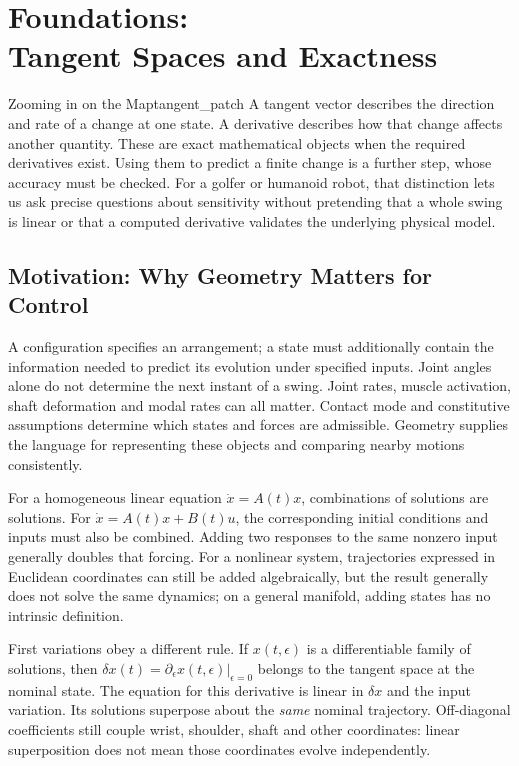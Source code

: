 \chapter[Foundations: Tangent Spaces and Exactness]{Foundations:\\Tangent Spaces and Exactness}
\label{ch:foundations}

\begin{laymansbox}{Zooming in on the Map}{tangent_patch}
A tangent vector describes the direction and rate of a change at one state. A derivative
describes how that change affects another quantity. These are exact mathematical objects
when the required derivatives exist. Using them to predict a finite change is a further
step, whose accuracy must be checked. For a golfer or humanoid robot, that distinction
lets us ask precise questions about sensitivity without pretending that a whole swing
is linear or that a computed derivative validates the underlying physical model.
\end{laymansbox}

\section{Motivation: Why Geometry Matters for Control}

A configuration specifies an arrangement; a state must additionally contain the information
needed to predict its evolution under specified inputs. Joint angles alone do not determine
the next instant of a swing. Joint rates, muscle activation, shaft deformation and modal
rates can all matter. Contact mode and constitutive assumptions determine which states
and forces are admissible. Geometry supplies the language for representing these objects
and comparing nearby motions consistently.

For a homogeneous linear equation $\dot x=A(t)x$, combinations of solutions are solutions.
For $\dot x=A(t)x+B(t)u$, the corresponding initial conditions and inputs must also be
combined. Adding two responses to the same nonzero input generally doubles that forcing.
For a nonlinear system, trajectories expressed in Euclidean coordinates can still be
added algebraically, but the result generally does not solve the same dynamics; on a
general manifold, adding states has no intrinsic definition.

First variations obey a different rule. If $x(t,\epsilon)$ is a differentiable family of
solutions, then $\delta x(t)=\partial_\epsilon x(t,\epsilon)|_{\epsilon=0}$ belongs to the
tangent space at the nominal state. The equation for this derivative is linear in
$\delta x$ and the input variation. Its solutions superpose about the \emph{same} nominal
trajectory. Off-diagonal coefficients still couple wrist, shoulder, shaft and other
coordinates: linear superposition does not mean those coordinates evolve independently.

